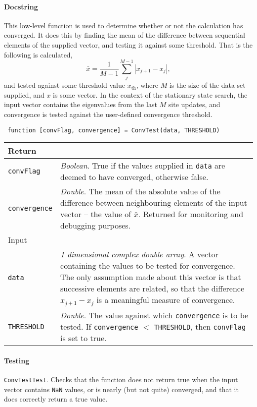  \paragraph{Docstring} This low-level function is used to determine whether or not the calculation has converged. It does this by finding the mean of the difference between sequential elements of the supplied vector, and testing it against some threshold. That is the following is calculated, 
 \begin{equation}
 	\bar{x} = \frac{1}{M-1} \sum_{j}^{M-1} | x_{j+1} - x_{j} |,
 \end{equation}
 and tested against some threshold value \(x_{\mathrm{th}}\), where \(M\) is the size of the data set supplied, and \(x\) is some vector. In the context of the stationary state search, the input vector contains the eigenvalues from the last \(M\) site updates, and convergence is tested against the user-defined convergence threshold.
 \begin{lstlisting}
 function [convFlag, convergence] = ConvTest(data, THRESHOLD) \end{lstlisting}
 \begin{longtabu}{X[1,1]X[4,1]}
 \hline
 Return & \\ \hline
 \lstinline$convFlag$ & \emph{Boolean}. True if the values supplied in \lstinline$data$ are deemed to have converged, otherwise false. \\
 \lstinline$convergence$ & \emph{Double}. The mean of the absolute value of the difference between neighbouring elements of the input vector -- the value of \(\bar{x}\). Returned for monitoring and debugging purposes. \\ \hline
 Input & \\ \hline
 \lstinline$data$ & \emph{1 dimensional complex double array}. A vector containing the values to be tested for convergence. The only assumption made about this vector is that successive elements are related, so that the difference \(x_{j+1} - x_{j}\) is a meaningful measure of convergence. \\
 \lstinline$THRESHOLD$ & \emph{Double}. The value against which \lstinline$convergence$ is to be tested. If \lstinline$convergence$ \(<\) \lstinline$THRESHOLD$, then \lstinline$convFlag$ is set to true. \\ 
 \hline
 \end{longtabu}
 \paragraph{Testing} \lstinline$ConvTestTest$. Checks that the function does not return true when the input vector contains \lstinline$NaN$ values, or is nearly (but not quite) converged, and that it does correctly return a true value.
  
